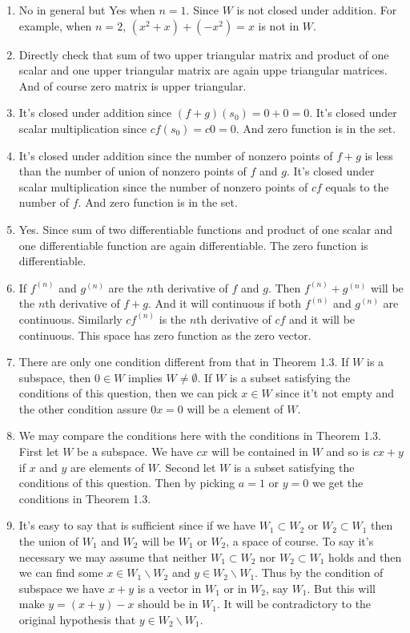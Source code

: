\begin{enumerate}
\item No in general but Yes when $n=1$. Since $W$ is not closed under addition. For example, when $n=2$, $(x^2+x)+(-x^2)=x$ is not in $W$.
\item Directly check that sum of two upper triangular matrix and product of one scalar and one upper triangular matrix are again uppe triangular matrices. And of course zero matrix is upper triangular.
\item It's closed under addition since $(f+g)(s_0)=0+0=0$. It's closed under scalar multiplication since $cf(s_0)=c 0=0$. And zero function is in the set.
\item It's closed under addition since the number of nonzero points of $f+g$ is less than the number of union of nonzero points of $f$ and $g$. It's closed under scalar multiplication since the number of nonzero points of $cf$ equals to the number of $f$. And zero function is in the set.
\item Yes. Since sum of two differentiable functions and product of one scalar and one differentiable function are again differentiable. The zero function is differentiable.
\item If $f^{(n)}$ and $g^{(n)}$ are the $n$th derivative of $f$ and $g$. Then $f^{(n)}+g^{(n)}$ will be the $n$th derivative of $f+g$. And it will continuous if both $f^{(n)}$ and $g^{(n)}$ are continuous. Similarly $cf^{(n)}$ is the $n$th derivative of $cf$ and it will be continuous. This space has zero function as the zero vector.
\item There are only one condition different from that in Theorem 1.3. If $W$ is a subspace, then $0\in W$ implies $W\neq \emptyset$. If $W$ is a subset satisfying the conditions of this question, then we can pick $x\in W$ since it't not empty and the other condition assure $0x=0$ will be a element of $W$.
\item We may compare the conditions here with the conditions in Theorem 1.3. First let $W$ be a subspace. We have $cx$ will be contained in $W$ and so is $cx+y$ if $x$ and $y$ are elements of $W$. Second let $W$ is a subset satisfying the conditions of this question. Then by picking $a=1$ or $y=0$ we get the conditions in Theorem 1.3.
\item It's easy to say that is sufficient since if we have $W_1\subset W_2$ or $W_2\subset W_1$ then the union of $W_1$ and $W_2$ will be $W_1$ or $W_2$, a space of course. To say it's necessary we may assume that neither $W_1\subset W_2$ nor $W_2\subset W_1$ holds and then we can find some $x\in W_1\backslash W_2$ and $y\in W_2\backslash W_1$. Thus by the condition of subspace we have $x+y$ is a vector in $W_1$ or in $W_2$, say $W_1$. But this will make $y=(x+y)-x$ should be in $W_1$. It will be contradictory to the original hypothesis that $y\in W_2\backslash W_1$.

\end{enumerate}

